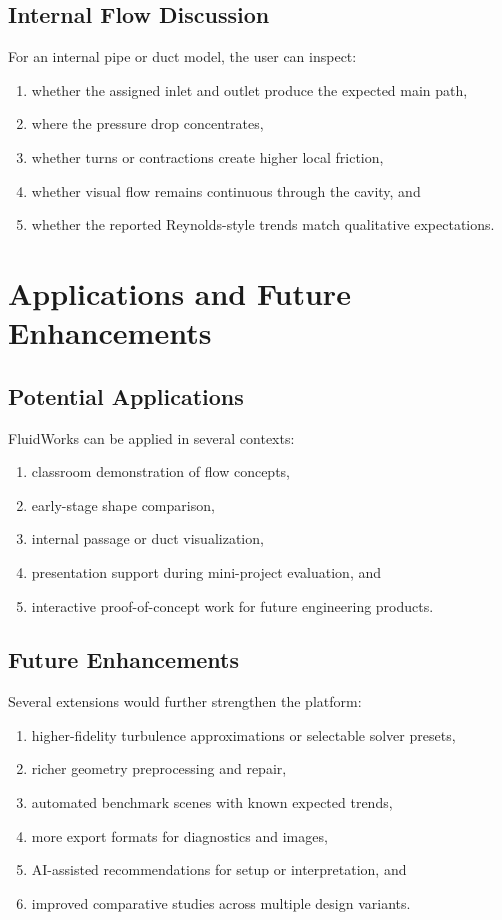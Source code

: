 \documentclass[12pt,a4paper,titlepage]{report}
\begin{document}
\section{Internal Flow Discussion}
For an internal pipe or duct model, the user can inspect:
\begin{enumerate}
\item whether the assigned inlet and outlet produce the expected main path,
\item where the pressure drop concentrates,
\item whether turns or contractions create higher local friction,
\item whether visual flow remains continuous through the cavity, and
\item whether the reported Reynolds-style trends match qualitative expectations.
\end{enumerate}

\chapter{Applications and Future Enhancements}
\section{Potential Applications}
FluidWorks can be applied in several contexts:
\begin{enumerate}
\item classroom demonstration of flow concepts,
\item early-stage shape comparison,
\item internal passage or duct visualization,
\item presentation support during mini-project evaluation, and
\item interactive proof-of-concept work for future engineering products.
\end{enumerate}

\section{Future Enhancements}
Several extensions would further strengthen the platform:
\begin{enumerate}
\item higher-fidelity turbulence approximations or selectable solver presets,
\item richer geometry preprocessing and repair,
\item automated benchmark scenes with known expected trends,
\item more export formats for diagnostics and images,
\item AI-assisted recommendations for setup or interpretation, and
\item improved comparative studies across multiple design variants.
\end{enumerate}
\end{document}
